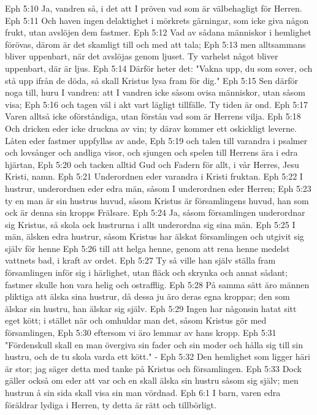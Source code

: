 Eph 5:10  Ja, vandren så, i det att I pröven vad som är välbehagligt för Herren.
Eph 5:11  Och haven ingen delaktighet i mörkrets gärningar, som icke giva någon frukt, utan avslöjen dem fastmer.
Eph 5:12  Vad av sådana människor i hemlighet förövas, därom är det skamligt till och med att tala;
Eph 5:13  men alltsammans bliver uppenbart, när det avslöjas genom ljuset. Ty varhelst något bliver uppenbart, där är ljus.
Eph 5:14  Därför heter det: "Vakna upp, du som sover, och stå upp ifrån de döda, så skall Kristus lysa fram för dig."
Eph 5:15  Sen därför noga till, huru I vandren: att I vandren icke såsom ovisa människor, utan såsom visa;
Eph 5:16  och tagen väl i akt vart lägligt tillfälle. Ty tiden är ond.
Eph 5:17  Varen alltså icke oförståndiga, utan förstån vad som är Herrens vilja.
Eph 5:18  Och dricken eder icke druckna av vin; ty därav kommer ett oskickligt leverne. Låten eder fastmer uppfyllas av ande,
Eph 5:19  och talen till varandra i psalmer och lovsånger och andliga visor, och sjungen och spelen till Herrens ära i edra hjärtan,
Eph 5:20  och tacken alltid Gud och Fadern för allt, i vår Herres, Jesu Kristi, namn.
Eph 5:21  Underordnen eder varandra i Kristi fruktan.
Eph 5:22  I hustrur, underordnen eder edra män, såsom I underordnen eder Herren;
Eph 5:23  ty en man är sin hustrus huvud, såsom Kristus är församlingens huvud, han som ock är denna sin kropps Frälsare.
Eph 5:24  Ja, såsom församlingen underordnar sig Kristus, så skola ock hustrurna i allt underordna sig sina män.
Eph 5:25  I män, älsken edra hustrur, såsom Kristus har älskat församlingen och utgivit sig själv för henne
Eph 5:26  till att helga henne, genom att rena henne medelst vattnets bad, i kraft av ordet.
Eph 5:27  Ty så ville han själv ställa fram församlingen inför sig i härlighet, utan fläck och skrynka och annat sådant; fastmer skulle hon vara helig och ostrafflig.
Eph 5:28  På samma sätt äro männen pliktiga att älska sina hustrur, då dessa ju äro deras egna kroppar; den som älskar sin hustru, han älskar sig själv.
Eph 5:29  Ingen har någonsin hatat sitt eget kött; i stället när och omhuldar man det, såsom Kristus gör med församlingen,
Eph 5:30  eftersom vi äro lemmar av hans kropp.
Eph 5:31  "Fördenskull skall en man övergiva sin fader och sin moder och hålla sig till sin hustru, och de tu skola varda ett kött." -
Eph 5:32  Den hemlighet som ligger häri är stor; jag säger detta med tanke på Kristus och församlingen.
Eph 5:33  Dock gäller också om eder att var och en skall älska sin hustru såsom sig själv; men hustrun å sin sida skall visa sin man vördnad.
Eph 6:1  I barn, varen edra föräldrar lydiga i Herren, ty detta är rätt och tillbörligt.
